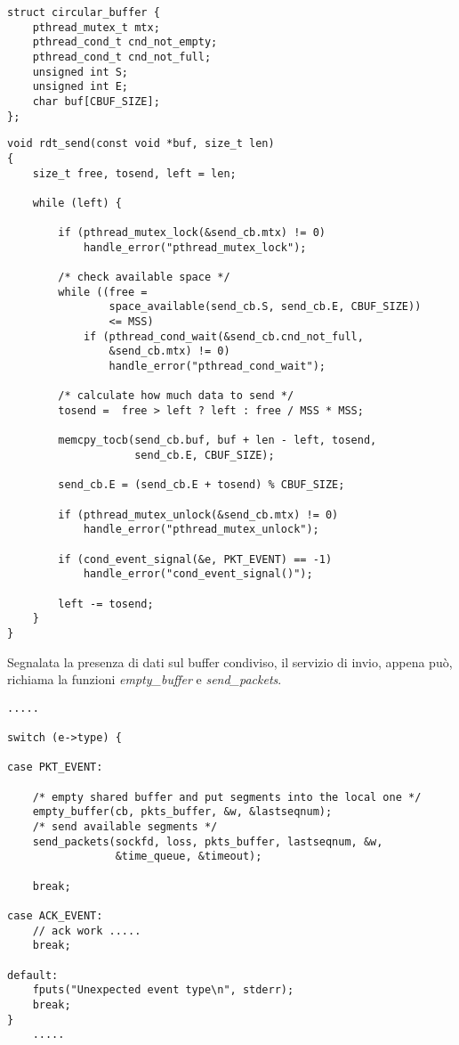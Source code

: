 \begin{lstlisting}[title=trasport.h]
struct circular_buffer {
    pthread_mutex_t mtx;
    pthread_cond_t cnd_not_empty;
    pthread_cond_t cnd_not_full;
    unsigned int S;
    unsigned int E;
    char buf[CBUF_SIZE];
};
\end{lstlisting}
\begin{lstlisting}[title=trasport.c]
void rdt_send(const void *buf, size_t len)
{
    size_t free, tosend, left = len;

    while (left) {

        if (pthread_mutex_lock(&send_cb.mtx) != 0)
            handle_error("pthread_mutex_lock");

        /* check available space */
        while ((free =
                space_available(send_cb.S, send_cb.E, CBUF_SIZE))
				<= MSS)
            if (pthread_cond_wait(&send_cb.cnd_not_full, 
				&send_cb.mtx) != 0)
                handle_error("pthread_cond_wait");

        /* calculate how much data to send */
        tosend =  free > left ?	left : free / MSS * MSS;

        memcpy_tocb(send_cb.buf, buf + len - left, tosend, 
					send_cb.E, CBUF_SIZE);

        send_cb.E = (send_cb.E + tosend) % CBUF_SIZE;

        if (pthread_mutex_unlock(&send_cb.mtx) != 0)
            handle_error("pthread_mutex_unlock");

        if (cond_event_signal(&e, PKT_EVENT) == -1)
            handle_error("cond_event_signal()");

        left -= tosend;
    }
}
\end{lstlisting}

Segnalata la presenza di dati sul buffer condiviso, il servizio di invio,
appena può, richiama la funzioni \emph{empty\_buffer} e \emph{send\_packets}.

\begin{lstlisting}[title=transport.c]
	.....

switch (e->type) {

case PKT_EVENT:

	/* empty shared buffer and put segments into the local one */
	empty_buffer(cb, pkts_buffer, &w, &lastseqnum);
	/* send available segments */
	send_packets(sockfd, loss, pkts_buffer, lastseqnum, &w,
				 &time_queue, &timeout);

	break;

case ACK_EVENT:
    // ack work .....
	break;

default:
	fputs("Unexpected event type\n", stderr);
	break;
}
	.....

\end{lstlisting}


